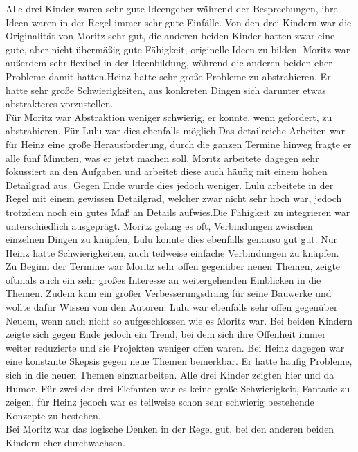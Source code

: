 Alle drei Kinder waren sehr gute Ideengeber während der Besprechungen, ihre Ideen waren in der Regel immer sehr gute Einfälle. Von den drei Kindern war die Originalität von Moritz sehr gut, die anderen beiden Kinder hatten zwar eine gute, aber nicht übermäßig gute Fähigkeit, originelle Ideen zu bilden. Moritz war außerdem sehr flexibel in der Ideenbildung, während die anderen beiden eher Probleme damit hatten.Heinz hatte sehr große Probleme zu abstrahieren. Er hatte sehr große Schwierigkeiten, aus konkreten Dingen sich darunter etwas abstrakteres vorzustellen.\\
Für Moritz war Abstraktion weniger schwierig, er konnte, wenn gefordert, zu abstrahieren. Für Lulu war dies ebenfalls möglich.Das detailreiche Arbeiten war für Heinz eine große Herausforderung, durch die ganzen Termine hinweg fragte er alle fünf Minuten, was er jetzt machen soll. Moritz arbeitete dagegen sehr fokussiert an den Aufgaben und arbeitet diese auch häufig mit einem hohen Detailgrad aus. Gegen Ende wurde dies jedoch weniger. Lulu arbeitete in der Regel mit einem gewissen Detailgrad, welcher zwar nicht sehr hoch war, jedoch trotzdem noch ein gutes Maß an Details aufwies.Die Fähigkeit zu integrieren war unterschiedlich ausgeprägt. Moritz gelang es oft, Verbindungen zwischen einzelnen Dingen zu knüpfen, Lulu konnte dies ebenfalls genauso gut gut. Nur Heinz hatte Schwierigkeiten, auch teilweise einfache Verbindungen zu knüpfen.\\
Zu Beginn der Termine war Moritz sehr offen gegenüber neuen Themen, zeigte oftmals auch ein sehr großes Interesse an weitergehenden Einblicken in die Themen. Zudem kam ein großer Verbesserungsdrang für seine Bauwerke und wollte dafür Wissen von den Autoren. Lulu war ebenfalls sehr offen gegenüber Neuem, wenn auch nicht so aufgeschlossen wie es Moritz war. Bei beiden Kindern zeigte sich gegen Ende jedoch ein Trend, bei dem sich ihre Offenheit immer weiter reduzierte und sie Projekten weniger offen waren. Bei Heinz dagegen war eine konstante Skepsis gegen neue Themen bemerkbar. Er hatte häufig Probleme, sich in die neuen Themen einzuarbeiten. Alle drei Kinder zeigten hier und da Humor. Für zwei der drei Elefanten war es keine große Schwierigkeit, Fantasie zu zeigen, für Heinz jedoch war es teilweise schon sehr schwierig bestehende Konzepte zu bestehen.\\
Bei Moritz war das logische Denken in der Regel gut, bei den anderen beiden Kindern eher durchwachsen.

